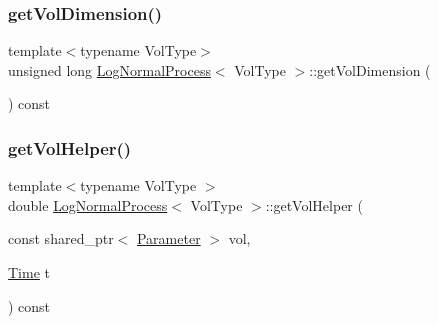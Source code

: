 \subsubsection{\texorpdfstring{get\+Vol\+Dimension()}{getVolDimension()}}
{\footnotesize\ttfamily template$<$typename Vol\+Type$>$ \\
unsigned long \hyperlink{class_log_normal_process}{Log\+Normal\+Process}$<$ Vol\+Type $>$\+::get\+Vol\+Dimension (\begin{DoxyParamCaption}{ }\end{DoxyParamCaption}) const\hspace{0.3cm}{\ttfamily [inline]}}

\hypertarget{class_log_normal_process_a547e799140c1575cc979416f3cf7ab24}{}\label{class_log_normal_process_a547e799140c1575cc979416f3cf7ab24} 
\subsubsection{\texorpdfstring{get\+Vol\+Helper()}{getVolHelper()}\hspace{0.1cm}{\footnotesize\ttfamily [1/2]}}
{\footnotesize\ttfamily template$<$typename Vol\+Type $>$ \\
double \hyperlink{class_log_normal_process}{Log\+Normal\+Process}$<$ Vol\+Type $>$\+::get\+Vol\+Helper (\begin{DoxyParamCaption}\item[{const shared\+\_\+ptr$<$ \hyperlink{class_parameter}{Parameter} $>$}]{vol,  }\item[{\hyperlink{_name_def_8h_ac2d3e0ba793497bcca555c7c2cf64ff3}{Time}}]{t }\end{DoxyParamCaption}) const\hspace{0.3cm}{\ttfamily [protected]}}

\hypertarget{class_log_normal_process_aa65ab0e1f6b6679f49e993dfd1d3e9a0}{}\label{class_log_normal_process_aa65ab0e1f6b6679f49e993dfd1d3e9a0} 
